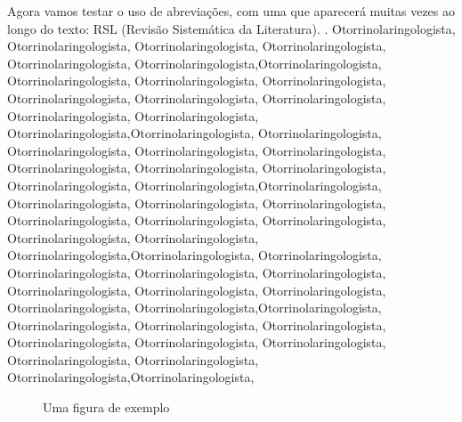 Agora vamos testar o uso de abreviações, com uma que aparecerá muitas vezes ao longo do texto: RSL (Revisão Sistemática da Literatura). . Otorrinolaringologista, Otorrinolaringologista, Otorrinolaringologista, Otorrinolaringologista, Otorrinolaringologista, Otorrinolaringologista,Otorrinolaringologista, Otorrinolaringologista, Otorrinolaringologista, Otorrinolaringologista, Otorrinolaringologista, Otorrinolaringologista, Otorrinolaringologista, Otorrinolaringologista, Otorrinolaringologista, Otorrinolaringologista,Otorrinolaringologista, Otorrinolaringologista, Otorrinolaringologista, Otorrinolaringologista, Otorrinolaringologista, Otorrinolaringologista, Otorrinolaringologista, Otorrinolaringologista, Otorrinolaringologista, Otorrinolaringologista,Otorrinolaringologista, Otorrinolaringologista, Otorrinolaringologista, Otorrinolaringologista, Otorrinolaringologista, Otorrinolaringologista, Otorrinolaringologista, Otorrinolaringologista, Otorrinolaringologista, Otorrinolaringologista,Otorrinolaringologista, Otorrinolaringologista, Otorrinolaringologista, Otorrinolaringologista, Otorrinolaringologista, Otorrinolaringologista, Otorrinolaringologista, Otorrinolaringologista, Otorrinolaringologista, Otorrinolaringologista,Otorrinolaringologista, Otorrinolaringologista, Otorrinolaringologista, Otorrinolaringologista, Otorrinolaringologista, Otorrinolaringologista, Otorrinolaringologista, Otorrinolaringologista, Otorrinolaringologista, Otorrinolaringologista,Otorrinolaringologista,

\begin{figure}[!hbt]
  \centering
  \caption{Uma figura de exemplo}
  \label{figura-exemplo}
\end{figure}

